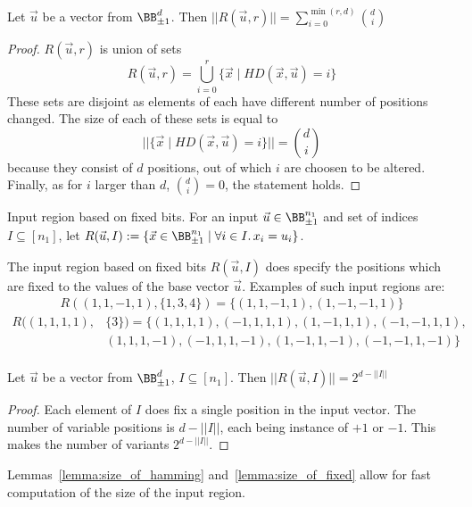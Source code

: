 \begin{lemma}{Let $\vec u$ be a vector from $\BB^{d}_{\pm 1}$.
    Then $||R(\vec u, r)|| = \sum_{i=0}^{\min(r, d)} {d\choose i}$}%
    \label{lemma:size_of_hamming}%
    \begin{proof}
        $R(\vec u, r)$ is union of sets
        \begin{equation*}
            R(\vec u, r) = \bigcup_{i=0}^{r} \{\vec x \mid HD(\vec x, \vec u) = i\}
        \end{equation*}
        These sets are disjoint as elements of each have different number
        of positions changed. The size of each of these sets is equal to
        \begin{equation*}
            ||\{\vec x \mid HD(\vec x, \vec u) = i\}|| = {d\choose i}
        \end{equation*}
        because they consist of $d$ positions, out of which $i$ are choosen to be altered.
        Finally, as for $i$ larger than $d$, ${d\choose i}=0$, the statement holds.
    \end{proof}
\end{lemma}

\begin{definition}{Input region based on fixed bits.}
    For an input $\vec u\in \BB^{n_1}_{\pm 1}$ and set of indices $I \subseteq [n_1]$, let
    $R(\vec u, I) := \{\vec x\in \BB^{n_1}_{\pm 1} \mid \forall i\in I.\, x_i = u_i \}$.
\end{definition}

The input region based on fixed bits $R(\vec u, I)$ does specify
the positions which are fixed to the values of the base vector $\vec u$.
Examples of such input regions are:
\begin{align*}
    R((1,1,-1,1), \{1,3,4\}) = \{(1,1,-1,1), (1,-1,-1,1)\}
\end{align*}
\begin{align*}
    R((1,1,1,1), &\{3\}) = \{(1,1,1,1), (-1,1,1,1), (1,-1,1,1), (-1,-1,1,1),\\
    &(1,1,1,-1), (-1,1,1,-1), (1,-1,1,-1), (-1,-1,1,-1)\}\\
\end{align*}

\begin{lemma}{Let $\vec u$ be a vector from $\BB^{d}_{\pm 1}$, $I\subseteq [n_1]$.
    Then $||R(\vec u, I)|| = 2^{d-||I||}$}%
    \label{lemma:size_of_fixed}%
    \begin{proof}
        Each element of $I$ does fix a single position in the input vector.
        The number of variable positions is $d-||I||$, each being instance of
        $+1$ or $-1$. This makes the number of variants $2^{d-||I||}$.
    \end{proof}
\end{lemma}

\begin{remark}
    Lemmas~\ref{lemma:size_of_hamming} and~\ref{lemma:size_of_fixed}
    allow for fast computation of the size of the input region.
\end{remark}

